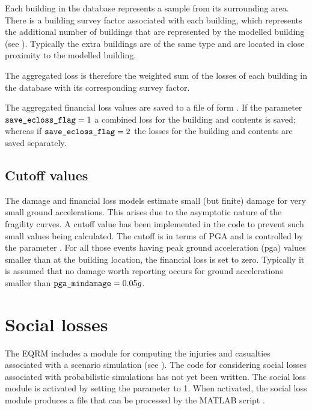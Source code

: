 Each building in the database represents a sample from its
surrounding area. There is a building survey factor associated
with each building, which represents the additional number of
buildings that are represented by the modelled building (see
). Typically the extra buildings
are of the same type and are located in close proximity to the
modelled building.

The aggregated loss is therefore the weighted sum of the losses of
each building in the database with its corresponding survey factor.

The aggregated financial loss values are saved to a file of form
. If the
 parameter
$\typepar{save}{\_ecloss}{\_flag}=1$ a combined loss for the
building and contents is saved; whereas if
$\typepar{save}{\_ecloss}{\_flag}=2$ the losses for the building
and contents are saved separately.


\subsection{Cutoff values}

The damage and financial loss models estimate small (but finite)
damage for very small ground accelerations. This arises due to the
asymptotic nature of the fragility curves. A cutoff value has been
implemented in the code to prevent such small values being
calculated. The cutoff is in terms of PGA and is controlled by the
 parameter . For
all those events having peak ground acceleration (pga) values
smaller than  at the building
location, the financial loss is set to zero. Typically it is
assumed that no damage worth reporting occurs for ground
accelerations smaller than $\typepar{pga}{\_min}{damage}=0.05g$.


\section{Social losses}

The EQRM includes a module for computing the injuries and
casualties associated with a scenario simulation (see
). The code for considering social
losses associated with probabilistic simulations has not yet been
written. The social loss module is activated by setting the
 parameter 
to 1. When activated, the social loss module produces a file
 that can be
processed by the MATLAB script .

